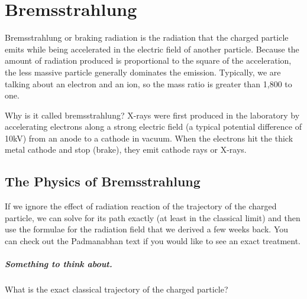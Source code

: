 \chapter{Bremsstrahlung}
\label{cha:bremsstrahlung}
Bremsstrahlung or braking radiation is the radiation that the charged
particle emits while being accelerated in the electric field of
another particle.  Because the amount of radiation produced is
proportional to the square of the acceleration, the less massive
particle generally dominates the emission.  Typically, we are talking
about an electron and an ion, so the mass ratio is greater than 1,800
to one.

Why is it called bremsstrahlung?  X-rays were first produced in the
laboratory by accelerating electrons along a strong electric field (a
typical potential difference of 10kV) from an anode to a cathode in
vacuum.  When the electrons hit the thick metal cathode and stop
(brake), they emit cathode rays or X-rays.

\section{The Physics of Bremsstrahlung}
\label{sec:phys-bremsstr}

If we ignore the effect of radiation reaction of the trajectory of the
charged particle, we can solve for its path exactly (at least in the
classical limit) and then use the formulae for the radiation field
that we derived a few weeks back.   You can check out the Padmanabhan
text if you would like to see an exact treatment.

\paragraph{Something to think about.}  What is the exact classical 
trajectory of the charged particle?  

